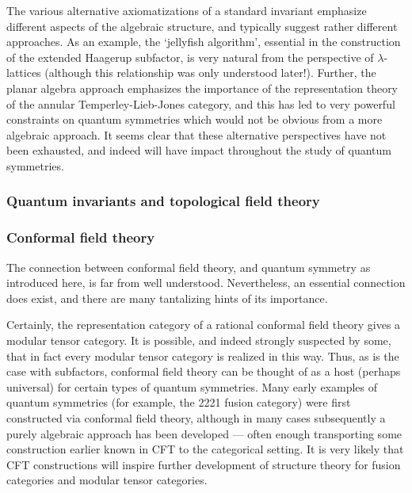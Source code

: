 \documentclass[11pt]{article}
\begin{document}
The various alternative axiomatizations of a standard invariant emphasize
different aspects of the algebraic structure, and typically suggest rather
different approaches. As an example, the `jellyfish algorithm', essential in
the construction of the extended Haagerup subfactor, is very natural from the
perspective of $\lambda$-lattices (although this relationship was only
understood later!). Further, the planar algebra approach emphasizes the
importance of the representation theory of the annular Temperley-Lieb-Jones
category, and this has led to very powerful constraints on quantum symmetries
which would not be obvious from a more algebraic approach. It seems clear that
these alternative perspectives have not been exhausted, and indeed will have
impact throughout the study of quantum symmetries.



\subsubsection{Quantum invariants and topological field theory}

\subsubsection{Conformal field theory}

The connection between conformal field theory, and quantum symmetry as
introduced here, is far from well understood. Nevertheless, an essential
connection does exist, and there are many tantalizing hints of its importance.

Certainly, the representation category of a rational conformal field theory
gives a modular tensor category. It is possible, and indeed strongly suspected
by some, that in fact every modular tensor category is realized in this way.
Thus, as is the case with subfactors, conformal field theory can be thought of
as a host (perhaps universal) for certain types of quantum symmetries. Many
early examples of quantum symmetries (for example, the 2221 fusion category)
were first constructed via conformal field theory, although in many cases
subsequently a purely algebraic approach has been developed --- often enough
transporting some construction earlier known in CFT to the categorical
setting. It is very likely that CFT constructions will inspire further
development of structure theory for fusion categories and modular tensor
categories.
\end{document}
